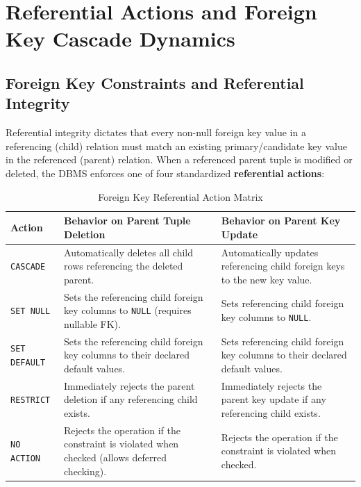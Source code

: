 \section{Referential Actions and Foreign Key Cascade Dynamics}
\label{sec:dbms_sql_referential_actions}

\subsection{Foreign Key Constraints and Referential Integrity}
Referential integrity dictates that every non-null foreign key value in a referencing (child) relation must match an existing primary/candidate key value in the referenced (parent) relation. When a referenced parent tuple is modified or deleted, the DBMS enforces one of four standardized \textbf{referential actions}:

\begin{table}[htbp]
\centering
\small
\caption{Foreign Key Referential Action Matrix}
\label{tab:referential_actions}
\begin{tabularx}{\textwidth}{l X X}
\toprule
\textbf{Action} & \textbf{Behavior on Parent Tuple Deletion} & \textbf{Behavior on Parent Key Update} \\
\midrule
\texttt{CASCADE} & Automatically deletes all child rows referencing the deleted parent. & Automatically updates referencing child foreign keys to the new key value. \\
\texttt{SET NULL} & Sets the referencing child foreign key columns to \texttt{NULL} (requires nullable FK). & Sets referencing child foreign key columns to \texttt{NULL}. \\
\texttt{SET DEFAULT} & Sets the referencing child foreign key columns to their declared default values. & Sets referencing child foreign key columns to their declared default values. \\
\texttt{RESTRICT} & Immediately rejects the parent deletion if any referencing child exists. & Immediately rejects the parent key update if any referencing child exists. \\
\texttt{NO ACTION} & Rejects the operation if the constraint is violated when checked (allows deferred checking). & Rejects the operation if the constraint is violated when checked. \\
\bottomrule
\end{tabularx}
\end{table}

